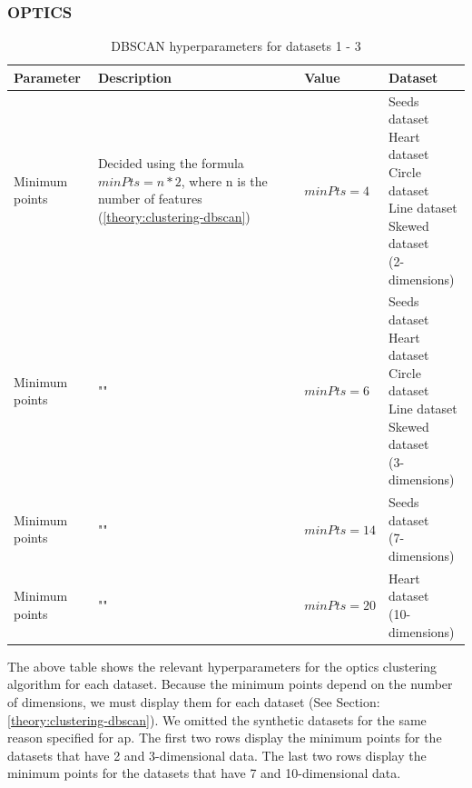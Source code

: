 \subsubsection{OPTICS}

\begin{table}[h]
  \begin{tabular}{|l|p{6cm}|l|l|}
    \hline
    Parameter      & Description                                                                                                    & Value       & Dataset                    \\
    \hline
    Minimum points & Decided using the formula $minPts = n * 2$, where n is the number of features (\ref{theory:clustering-dbscan}) & $minPts=4$  & \makecell[l]{Seeds dataset \\ Heart dataset \\ Circle dataset \\ Line dataset \\ Skewed dataset \\ (2-dimensions)}  \\
    \hline
    Minimum points & ""                                                                                                             & $minPts=6$  & \makecell[l]{Seeds dataset \\ Heart dataset \\ Circle dataset \\ Line dataset \\ Skewed dataset \\ (3-dimensions)} \\
    \hline
    Minimum points & ""                                                                                                             & $minPts=14$ & \makecell[l]{Seeds dataset \\ (7-dimensions)}  \\
    \hline
    Minimum points & ""                                                                                                             & $minPts=20$ & \makecell[l]{Heart dataset \\ (10-dimensions)} \\
    \hline
  \end{tabular}
  \caption{DBSCAN  hyperparameters for datasets 1 - 3}
  \label{tab:dbscan-formula-sklearn}
\end{table}
The above table shows the relevant hyperparameters for the \gls{optics} clustering algorithm for each dataset.
Because the minimum points depend on the number of dimensions, we must display them for each dataset (See Section: \ref{theory:clustering-dbscan}).
We omitted the synthetic datasets for the same reason specified for \gls{ap}.
The first two rows display the minimum points for the datasets that have 2 and 3-dimensional data.
The last two rows display the minimum points for the datasets that have 7 and 10-dimensional data.
\newpage
